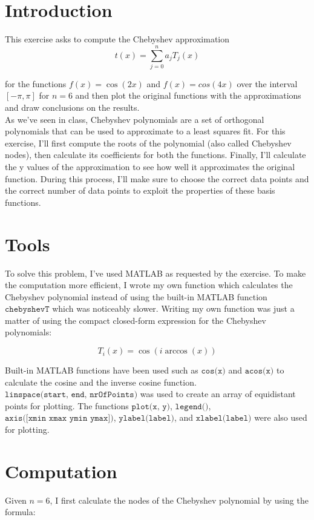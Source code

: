 \documentclass{article}
\newcommand{\code}{\texttt}
\begin{document}
\section{Introduction}\label{sec:intro}
This exercise asks to compute the Chebyshev approximation
$$t(x)=\sum^n_{j=0}{a_jT_j(x)}$$

for the functions $f(x)=\cos(2x)$ and $f(x)=cos(4x)$ over the interval $[-\pi,\pi]$ for $n = 6$ and then plot the original functions with the approximations and draw conclusions on the results.\\

As we've seen in class, Chebyshev polynomials are a set of orthogonal polynomials that can be used to approximate to a least squares fit. For this exercise, I'll first compute the roots of the polynomial (also called Chebyshev nodes), then calculate its coefficients for both the functions. Finally, I'll calculate the y values of the approximation to see how well it approximates the original function. During this process, I'll make sure to choose the correct data points and the correct number of data points to exploit the properties of these basis functions.

\section{Tools}
To solve this problem, I've used MATLAB as requested by the exercise. To make the computation more efficient, I wrote my own function which calculates the Chebyshev polynomial instead of using the built-in MATLAB function $\code{chebyshevT}$ which was noticeably slower. Writing my own function was just a matter of using the compact closed-form expression for the Chebyshev polynomials:

$$T_i(x)=\cos{(i\arccos(x))}$$ 

Built-in MATLAB functions have been used such as $\code{cos(x)}$ and $\code{acos(x)}$ to calculate the cosine and the inverse cosine function. $\code{linspace(start, end, nrOfPoints)}$ was used to create an array of equidistant points for plotting. The functions $\code{plot(x, y)}$, $\code{legend()}$, $\code{axis([xmin xmax ymin ymax])}$, $\code{ylabel(label)}$, and $\code{xlabel(label)}$ were also used for plotting.

\section{Computation}
Given $n=6$, I first calculate the nodes of the Chebyshev polynomial by using the formula:
\end{document}
